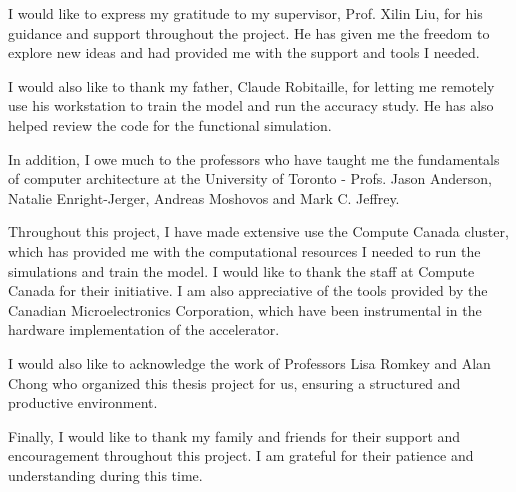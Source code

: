 I would like to express my gratitude to my supervisor, Prof. Xilin Liu, for his guidance and support throughout the project. He has given me the freedom to explore new ideas and had provided me with the
support and tools I needed.

I would also like to thank my father, Claude Robitaille, for letting me remotely use his workstation to train the model and run the accuracy study. He has also helped review the code for the functional simulation.

In addition, I owe much to the professors who have taught me the fundamentals of computer architecture at the University of Toronto - Profs. Jason Anderson, Natalie Enright-Jerger, Andreas Moshovos and Mark C. Jeffrey.

Throughout this project, I have made extensive use the Compute Canada cluster, which has provided me with the computational resources I needed to run the simulations and train the model. I would like to thank the 
staff at Compute Canada for their initiative. I am also appreciative of the tools provided by the Canadian Microelectronics Corporation, which have been instrumental in the hardware implementation of the accelerator.

I would also like to acknowledge the work of Professors Lisa Romkey and Alan Chong who organized this thesis project for us, ensuring a structured and productive environment.

Finally, I would like to thank my family and friends for their support and encouragement throughout this project. I am grateful for their patience and understanding during this time.
